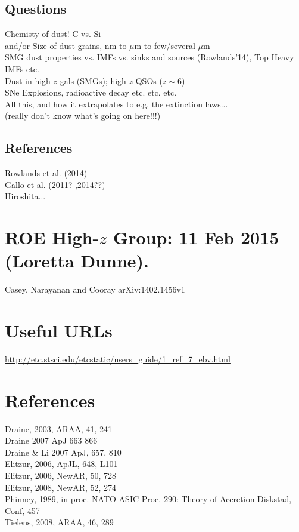 \documentclass[11pt]{article}
\begin{document}
    \subsection{Questions}
    Chemisty of dust! C vs. Si\\
    and/or Size of dust grains, nm to $\mu$m to few/several $\mu$m\\
    SMG dust properties vs. IMFs vs. sinks and sources (Rowlands'14),    Top Heavy IMFs etc. \\
    Dust in high-$z$ gals (SMGs); high-$z$ QSOs ($z\sim6$)\\
    SNe Explosions, radioactive decay etc. etc. etc. \\
    All this, and how it extrapolates to e.g. the extinction laws... \\
    (really don't know what's going on here!!!) \\
    
    \subsection{References}
    Rowlands et al. (2014)\\
    Gallo et al. (2011? ,2014??)\\
    Hiroshita... 


\section{ROE High-$z$ Group: 11 Feb 2015 (Loretta Dunne).}
Casey, Narayanan and Cooray arXiv:1402.1456v1\\

\section{Useful URLs}
\href{http://etc.stsci.edu/etcstatic/users\_guide/1\_ref\_7\_ebv.html}{http://etc.stsci.edu/etcstatic/users\_guide/1\_ref\_7\_ebv.html}

\section{References}
Draine, 2003, ARAA, 41, 241 \\
Draine 2007 ApJ 663 866 \\
Draine \& Li 2007 ApJ, 657, 810\\
Elitzur, 2006, ApJL, 648, L101 \\
Elitzur, 2006, NewAR, 50, 728 \\
Elitzur, 2008, NewAR, 52, 274 \\
Phinney, 1989, in proc. NATO ASIC Proc. 290: Theory of Accretion Diskstad, Conf, 457 \\
Tielens, 2008, ARAA, 46, 289 \\




\end{document}
